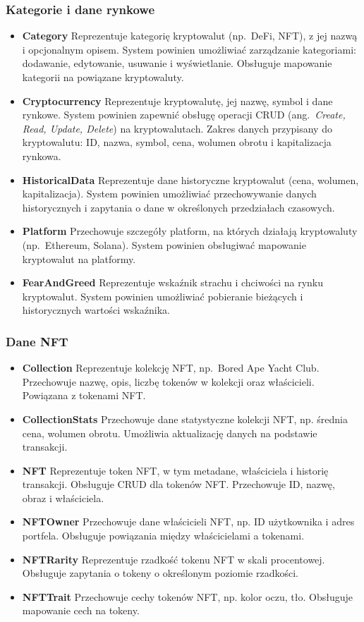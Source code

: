 \subsubsection{Kategorie i dane rynkowe}
\begin{itemize}
\item \textbf{Category} Reprezentuje kategorię kryptowalut (np.\ DeFi, NFT), z jej nazwą i opcjonalnym opisem. System powinien umożliwiać zarządzanie kategoriami: dodawanie, edytowanie, usuwanie i wyświetlanie. Obsługuje mapowanie kategorii na powiązane kryptowaluty.
\item \textbf{Cryptocurrency} Reprezentuje kryptowalutę, jej nazwę, symbol i dane rynkowe. System powinien zapewnić obsługę operacji CRUD (ang.~\emph{Create, Read, Update, Delete}) na kryptowalutach. Zakres danych przypisany do kryptowalutu: ID, nazwa, symbol, cena, wolumen obrotu i kapitalizacja rynkowa.
\item \textbf{HistoricalData} Reprezentuje dane historyczne kryptowalut (cena, wolumen, kapitalizacja). System powinien umożliwiać przechowywanie danych historycznych i zapytania o dane w określonych przedziałach czasowych.
\item \textbf{Platform} Przechowuje szczegóły platform, na których działają kryptowaluty (np.\ Ethereum, Solana). System powinien obsługiwać mapowanie kryptowalut na platformy.
\item \textbf{FearAndGreed} Reprezentuje wskaźnik strachu i chciwości na rynku kryptowalut. System powinien umożliwiać pobieranie bieżących i historycznych wartości wskaźnika.
\end{itemize}

\subsubsection{Dane NFT}
\begin{itemize}
\item \textbf{Collection} Reprezentuje kolekcję NFT, np.\ Bored Ape Yacht Club. Przechowuje nazwę, opis, liczbę tokenów w kolekcji oraz właścicieli. Powiązana z tokenami NFT.
\item \textbf{CollectionStats} Przechowuje dane statystyczne kolekcji NFT, np. średnia cena, wolumen obrotu. Umożliwia aktualizację danych na podstawie transakcji.
\item \textbf{NFT} Reprezentuje token NFT, w tym metadane, właściciela i historię transakcji. Obsługuje CRUD dla tokenów NFT. Przechowuje ID, nazwę, obraz i właściciela.
\item \textbf{NFTOwner} Przechowuje dane właścicieli NFT, np. ID użytkownika i adres portfela. Obsługuje powiązania między właścicielami a tokenami.
\item \textbf{NFTRarity} Reprezentuje rzadkość tokenu NFT w skali procentowej. Obsługuje zapytania o tokeny o określonym poziomie rzadkości.
\item \textbf{NFTTrait} Przechowuje cechy tokenów NFT, np. kolor oczu, tło. Obsługuje mapowanie cech na tokeny.
\end{itemize}

